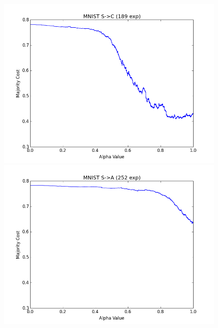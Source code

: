 \begin{figure}[h]
\centering
\begin{minipage}{.3\textwidth}
  \centering
  \includegraphics[width=\linewidth]{images/MNIST_SC_250}
\end{minipage}
\begin{minipage}{.3\textwidth}
  \centering
  \includegraphics[width=\linewidth]{images/MNIST_SA_250}
\end{minipage}
\begin{minipage}{.3\textwidth}
  \centering

\end{minipage}
\end{figure}

